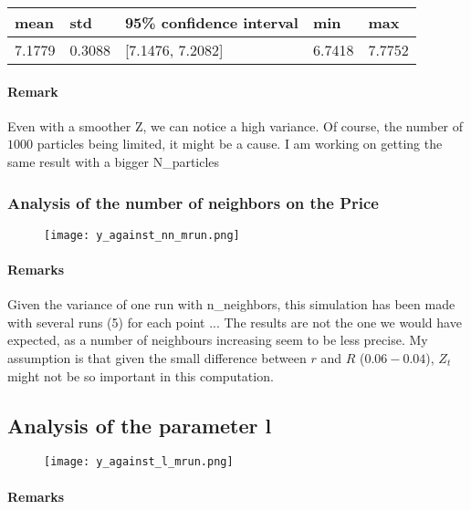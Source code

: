 \documentclass[english,11pt,openany]{article}
\theoremstyle{definition}
\begin{document}
\begin{titlepage}
\begin{table}[]
		\begin{tabular}{lllll}
			mean & std & 95\% confidence interval & min & max \\
			\hline
			  7.1779 	&	0.3088 & [7.1476, 7.2082] &	6.7418&	7.7752
		\end{tabular}
\end{table}
\newpage
\newpage


\paragraph{Remark}

Even with a smoother Z, we can notice a high variance. Of course, the number of $1000$ particles being limited, it might be a cause. I am working on getting the same result with a bigger N\_particles


\subsubsection{Analysis of the number of neighbors on the Price}

\begin{figure}[!htb]
	\centering
	\texttt{[image: y\_against\_nn\_mrun.png]} 
\end{figure}


\paragraph{Remarks}

Given the variance of one run with n\_neighbors, this simulation has been made with several runs (5) for each point ... 
The results are not the one we would have expected, as a number of neighbours increasing seem to be less precise. 
My assumption is that given the small difference between $r$ and $R$ ($0.06 - 0.04$), $Z_t$ might not be so important in this computation.  

\subsection{Analysis of the parameter l}

\begin{figure}[!htb]
	\centering
	\texttt{[image: y\_against\_l\_mrun.png]} 
\end{figure}

\newpage

\paragraph{Remarks}


\end{titlepage}
\end{document}
